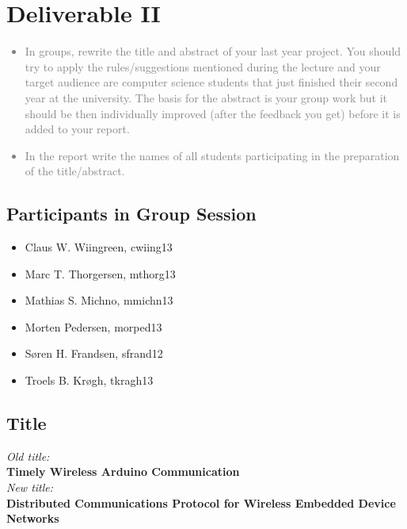 \chapter{Deliverable II}
\textcolor{gray}{%
\begin{itemize}
        \item In groups, rewrite the title and abstract of your last year project. You should try to apply the rules/suggestions mentioned during the lecture and your target audience are computer science students that just finished their second year at the university. The basis for the abstract is your group work but it should be then individually improved (after the feedback you get) before it is added to your report.
        \item In the report write the names of all students participating in the preparation of the title/abstract.
\end{itemize}}
\section{Participants in Group Session}
\begin{multicols}{2}
    \begin{itemize}
        \item Claus W. Wiingreen, cwiing13
        \item Marc T. Thorgersen, mthorg13
        \item Mathias S. Michno, mmichn13
        \item Morten Pedersen, morped13
        \item Søren H. Frandsen, sfrand12
        \item Troels B. Krøgh, tkragh13
    \end{itemize}
\end{multicols}

\section{Title}
\begin{center}
    \textit{Old title:} \\
    \textbf{Timely Wireless Arduino Communication}\\
    \textit{New title:}\\
    \textbf{Distributed Communications Protocol for Wireless Embedded Device Networks}
\end{center}
